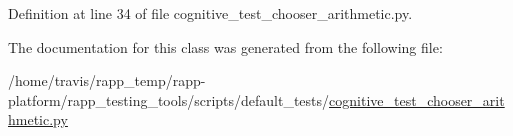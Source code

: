 Definition at line 34 of file cognitive\-\_\-test\-\_\-chooser\-\_\-arithmetic.\-py.



The documentation for this class was generated from the following file\-:\begin{DoxyCompactItemize}
\item 
/home/travis/rapp\-\_\-temp/rapp-\/platform/rapp\-\_\-testing\-\_\-tools/scripts/default\-\_\-tests/\hyperlink{cognitive__test__chooser__arithmetic_8py}{cognitive\-\_\-test\-\_\-chooser\-\_\-arithmetic.\-py}\end{DoxyCompactItemize}
